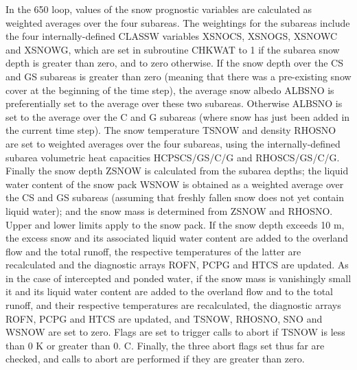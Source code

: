In the 650 loop, values of the snow prognostic variables are calculated as weighted averages over the four subareas. The weightings for the subareas include the four internally-\/defined C\+L\+A\+S\+S\+W variables X\+S\+N\+O\+C\+S, X\+S\+N\+O\+G\+S, X\+S\+N\+O\+W\+C and X\+S\+N\+O\+W\+G, which are set in subroutine C\+H\+K\+W\+A\+T to 1 if the subarea snow depth is greater than zero, and to zero otherwise. If the snow depth over the C\+S and G\+S subareas is greater than zero (meaning that there was a pre-\/existing snow cover at the beginning of the time step), the average snow albedo A\+L\+B\+S\+N\+O is preferentially set to the average over these two subareas. Otherwise A\+L\+B\+S\+N\+O is set to the average over the C and G subareas (where snow has just been added in the current time step). The snow temperature T\+S\+N\+O\+W and density R\+H\+O\+S\+N\+O are set to weighted averages over the four subareas, using the internally-\/defined subarea volumetric heat capacities H\+C\+P\+S\+C\+S/\+G\+S/\+C/\+G and R\+H\+O\+S\+C\+S/\+G\+S/\+C/\+G. Finally the snow depth Z\+S\+N\+O\+W is calculated from the subarea depths; the liquid water content of the snow pack W\+S\+N\+O\+W is obtained as a weighted average over the C\+S and G\+S subareas (assuming that freshly fallen snow does not yet contain liquid water); and the snow mass is determined from Z\+S\+N\+O\+W and R\+H\+O\+S\+N\+O. Upper and lower limits apply to the snow pack. If the snow depth exceeds 10 m, the excess snow and its associated liquid water content are added to the overland flow and the total runoff, the respective temperatures of the latter are recalculated and the diagnostic arrays R\+O\+F\+N, P\+C\+P\+G and H\+T\+C\+S are updated. As in the case of intercepted and ponded water, if the snow mass is vanishingly small it and its liquid water content are added to the overland flow and to the total runoff, and their respective temperatures are recalculated, the diagnostic arrays R\+O\+F\+N, P\+C\+P\+G and H\+T\+C\+S are updated, and T\+S\+N\+O\+W, R\+H\+O\+S\+N\+O, S\+N\+O and W\+S\+N\+O\+W are set to zero. Flags are set to trigger calls to abort if T\+S\+N\+O\+W is less than 0 K or greater than 0. C. Finally, the three abort flags set thus far are checked, and calls to abort are performed if they are greater than zero.

